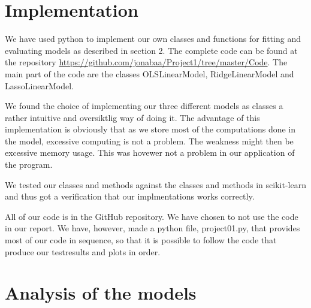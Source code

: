 \documentclass[a4paper,norsk]{article}
\begin{document}
\section{Implementation}
We have used python to implement our own classes and functions for 
fitting and evaluating models as described in section 2.  
The complete code can be found at the repository 
\url{https://github.com/jonabaa/Project1/tree/master/Code}. 
The main part of the code
are the classes OLSLinearModel, RidgeLinearModel and LassoLinearModel. 
\par
We found the choice of implementing our three different models as classes 
a rather intuitive and oversiktlig way of doing it. The advantage of this
implementation is obviously that as we store most of the computations 
done in the model, excessive computing is not
a problem. The weakness might then be excessive memory usage. This was 
hovewer not a problem in our application of the program.
\par
We tested our classes and methods against the classes and methods in 
scikit-learn and thus got a verification that our implmentations 
works correctly.
\par 
All of our code is in the GitHub repository. We have chosen to 
not use the code in our report. We have, however, made a python file, 
project01.py, that provides most of our code in sequence, 
so that it is possible to follow the code that produce our testresults 
and plots in order.

\section{Analysis of the models}
\end{document}
